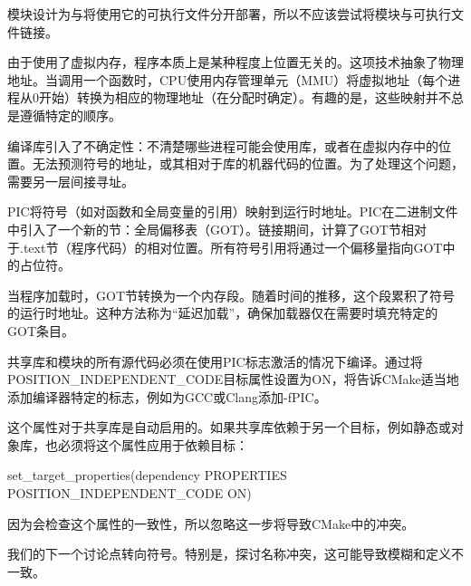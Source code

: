 模块设计为与将使用它的可执行文件分开部署，所以不应该尝试将模块与可执行文件链接。


由于使用了虚拟内存，程序本质上是某种程度上位置无关的。这项技术抽象了物理地址。当调用一个函数时，CPU使用内存管理单元（MMU）将虚拟地址（每个进程从0开始）转换为相应的物理地址（在分配时确定）。有趣的是，这些映射并不总是遵循特定的顺序。

编译库引入了不确定性：不清楚哪些进程可能会使用库，或者在虚拟内存中的位置。无法预测符号的地址，或其相对于库的机器代码的位置。为了处理这个问题，需要另一层间接寻址。

PIC将符号（如对函数和全局变量的引用）映射到运行时地址。PIC在二进制文件中引入了一个新的节：全局偏移表（GOT）。链接期间，计算了GOT节相对于.text节（程序代码）的相对位置。所有符号引用将通过一个偏移量指向GOT中的占位符。

当程序加载时，GOT节转换为一个内存段。随着时间的推移，这个段累积了符号的运行时地址。这种方法称为“延迟加载”，确保加载器仅在需要时填充特定的GOT条目。

共享库和模块的所有源代码必须在使用PIC标志激活的情况下编译。通过将POSITION\_INDEPENDENT\_CODE目标属性设置为ON，将告诉CMake适当地添加编译器特定的标志，例如为GCC或Clang添加-fPIC。

这个属性对于共享库是自动启用的。如果共享库依赖于另一个目标，例如静态或对象库，也必须将这个属性应用于依赖目标：

\begin{shell}
set_target_properties(dependency
                      PROPERTIES POSITION_INDEPENDENT_CODE ON)
\end{shell}

因为会检查这个属性的一致性，所以忽略这一步将导致CMake中的冲突。

我们的下一个讨论点转向符号。特别是，探讨名称冲突，这可能导致模糊和定义不一致。












